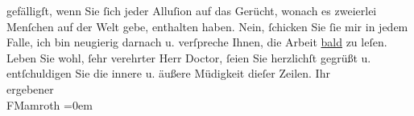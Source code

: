 \begin{ledgroupsized}[t]{13cm}
                    gefälligſt, wenn Sie ſich jeder Alluſion {\pb}auf das Gerücht, wonach es zweierlei
                    Menſchen auf der Welt gebe, enthalten haben. Nein, ſchicken Sie ſie mir in jedem
                    Falle, ich bin neugierig darnach u. verſpreche Ihnen, die Arbeit \uline{bald} zu leſen.\pend
           \pstart
           Leben Sie wohl, ſehr verehrter Herr Doctor, ſeien Sie herzlichſt gegrüßt u.
                    entſchuldigen Sie die innere u. äußere Müdigkeit dieſer Zeilen.\pend
           \pstart
           Ihr{\\[\baselineskip]}ergebener{\\[\baselineskip]}\spacefill\mbox{FMamroth}\pend
           \leftskip=0em{}\endnumbering{}\end{ledgroupsized}  \newcommand{\dateiname}{L00135}\newcommand{\titel}{Fedor Mamroth an Arthur Schnitzler, 17. 11. 1892}\newcommand{\editorInnen}{Martin Anton Müller und Gerd-Hermann Susen}
      